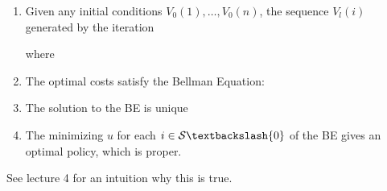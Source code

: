 \documentclass[10pt,a4paper]{scrartcl}
\begin{document}
\begin{multicols*}{2}
\begin{enumerate}
\item Given any initial conditions $V_0(1),\ldots,V_0(n)$, the sequence $V_l(i)$ generated by the iteration


where


\item The optimal costs satisfy the Bellman Equation:


\item The solution to the BE is unique
\item The minimizing $u$ for each $i\in\mathcal{S}\textbackslash\{0\}$ of the BE gives an optimal policy, which is proper.
\end{enumerate}

See lecture 4 for an intuition why this is true.

\end{multicols*}
\end{document}

